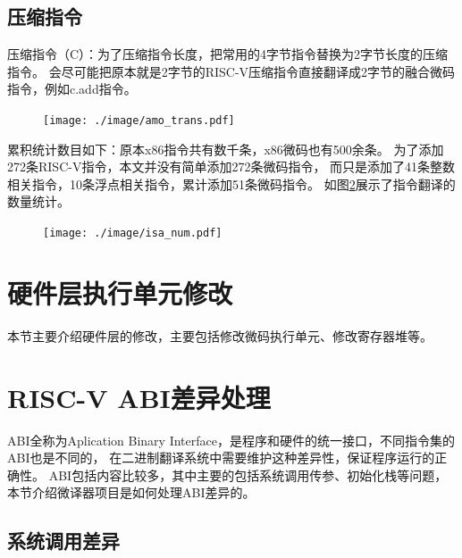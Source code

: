 \subsection{压缩指令}
压缩指令（C）：为了压缩指令长度，把常用的4字节指令替换为2字节长度的压缩指令。
会尽可能把原本就是2字节的RISC-V压缩指令直接翻译成2字节的融合微码指令，例如c.add指令。



\begin{figure}[!htbp]
  \centering
  \texttt{[image: ./image/amo\_trans.pdf]}
  \label{img:amo_trans}
\end{figure}

累积统计数目如下：原本x86指令共有数千条，x86微码也有500余条。
为了添加272条RISC-V指令，本文并没有简单添加272条微码指令，
而只是添加了41条整数相关指令，10条浮点相关指令，累计添加51条微码指令。
如图\ref{img:isa_num}展示了指令翻译的数量统计。


\begin{figure}[!htbp]
  \centering
  \texttt{[image: ./image/isa\_num.pdf]}
  \label{img:isa_num}
\end{figure}

\section{硬件层执行单元修改}

本节主要介绍硬件层的修改，主要包括修改微码执行单元、修改寄存器堆等。


\section{RISC-V ABI差异处理}
ABI全称为Aplication Binary Interface，是程序和硬件的统一接口，不同指令集的ABI也是不同的，
在二进制翻译系统中需要维护这种差异性，保证程序运行的正确性。
ABI包括内容比较多，其中主要的包括系统调用传参、初始化栈等问题，本节介绍微译器项目是如何处理ABI差异的。


\subsection{系统调用差异}

